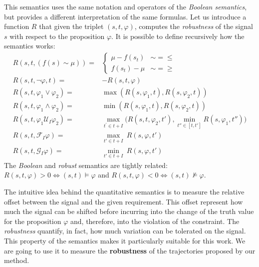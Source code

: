 This semantics uses the same notation and operators of the \textit{Boolean semantics}, but provides a different interpretation of the same formulas.
Let us introduce a function $R$ that given the triplet $(s, t, \varphi)$, computes the \textit{robustness} of the signal $s$ with respect to the proposition $\varphi$.
It is possible to define recursively how the semantics works:
\begin{align*} %
R(s,t,(f(s) \sim \mu)) = & \begin{cases} \mu-f(s_t) & \sim=\le \\ f(s_t)-\mu & \sim=\ge \end{cases}
\\
R(s,t,\neg \varphi,t) = & -R(s,t,\varphi)
\\
R(s,t,\varphi_1 \vee \varphi_2) = & \max(R(s,\varphi_1,t),R(s,\varphi_2,t) )
\\
R(s,t,\varphi_1 \wedge \varphi_2) = & \min(R(s,\varphi_1,t),R(s,\varphi_2,t) )
\\
R(s,t,\varphi_1 \mathcal{U}_I \varphi_2) = & \underset{t^\prime \in t+I} \max \big (  
 R(s,t,\varphi_2,t'), \underset{t'' \in [t,t']} \min R(s,\varphi_1,t'')\big)
\\
R(s,t, \mathcal{F}_I \varphi) = & \underset{t' \in t+I}\max ~ R(s,\varphi,t') \\
R(s,t,\mathcal{G}_I \varphi) = & \underset{t' \in t+I}\min~  R(s,\varphi,t')
\end{align*}
The \textit{Boolean} and \textit{robust} semantics are tightly related: $R(s,t, \varphi) > 0 \iff (s,t) \models \varphi$ and $R(s,t, \varphi) < 0 \iff (s,t) \not\models \varphi$.

The intuitive idea behind the quantitative semantics is to measure the relative offset between the signal and the given requirement.
This offset represent how much the signal can be shifted before incurring into the change of the truth value for the proposition $\varphi$ and, therefore, into the violation of the constraint.
The \textit{robustness} quantify, in fact, how much variation can be tolerated on the signal.
This property of the semantics makes it particularly suitable for this work.
We are going to use it to measure the \textbf{robustness} of the trajectories proposed by our method.


